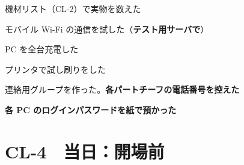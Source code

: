 \begin{cklist}
\item 機材リスト（CL-2）で実物を数えた
\item モバイル Wi-Fi の通信を試した（\textbf{テスト用サーバで}）
\item PC を全台充電した
\item プリンタで試し刷りをした
\item 連絡用グループを作った。\textbf{各パートチーフの電話番号を控えた}
\item \textbf{各 PC のログインパスワードを紙で預かった}
\end{cklist}

\ckfoot

\clearpage
\section*{CL-4　当日：開場前}

